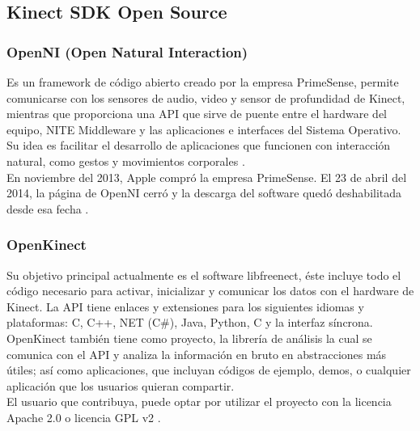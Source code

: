\subsection{Kinect SDK Open Source}
\subsubsection{OpenNI (Open Natural Interaction)}
Es un framework de código abierto creado por la empresa PrimeSense, permite comunicarse con los sensores de audio, video y sensor de profundidad de Kinect, mientras que proporciona una API que sirve de puente entre el hardware del equipo, NITE Middleware y las aplicaciones e interfaces del Sistema Operativo.  Su idea es facilitar el desarrollo de aplicaciones que funcionen con interacción natural, como gestos y movimientos corporales \cite{Echeverria}. \\

En noviembre del 2013, Apple compró la empresa PrimeSense. El 23 de abril del 2014, la página de OpenNI cerró y la descarga del software quedó deshabilitada desde esa fecha \cite{Armstrong}.

\subsubsection{OpenKinect}
Su objetivo principal actualmente es el software libfreenect, éste incluye todo el código necesario para activar, inicializar y comunicar los datos con el hardware de Kinect. La API  tiene enlaces y extensiones para los siguientes idiomas y plataformas: C, C++, NET (C\#), Java, Python, C y la interfaz síncrona.\\

OpenKinect también tiene como proyecto, la librería de análisis la cual se comunica con el API y analiza la información en bruto en abstracciones más útiles; así como aplicaciones, que incluyan códigos de ejemplo, demos, o cualquier aplicación que los usuarios quieran compartir.\\

El usuario que contribuya, puede optar por utilizar el proyecto con la licencia Apache 2.0 o licencia GPL v2 \cite{OpenKinect}. 